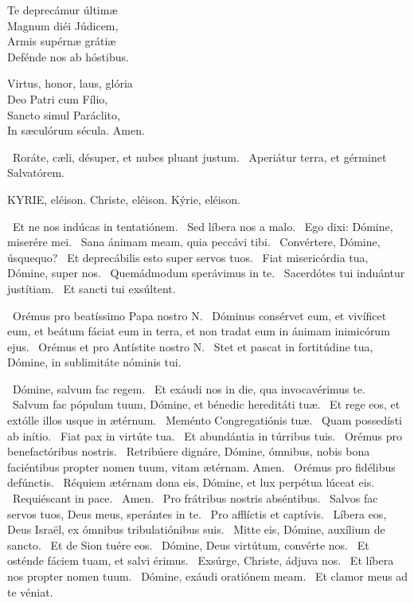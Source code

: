 Te deprecámur últimæ\\
Magnum diéi Júdicem,\\
Armis supérnæ grátiæ\\
Defénde nos ab hóstibus.

Virtus, honor, laus, glória\\
Deo Patri cum Fílio,\\
Sancto simul Paráclito,\\
In sæculórum sécula. Amen.

\V\ Roráte, cæli, désuper, et nubes pluant justum. \R\ Aperiátur terra, et gérminet Salvatórem.




KYRIE, eléison. Christe, eléison. Kýrie, eléison.

 \V\ Et ne nos indúcas in tentatiónem. \R\ Sed líbera nos a malo. \V\ Ego dixi: Dómine, miserére mei. \R\ Sana ánimam meam, quia peccávi tibi. \V\ Convértere, Dómine, úsquequo? \R\ Et deprecábilis esto super servos tuos. \V\ Fiat misericórdia tua, Dómine, super nos. \R\ Quemádmodum sperávimus in te. \V\ Sacerdótes tui induántur justítiam. \R\ Et sancti tui exsúltent.

\V\ Orémus pro beatíssimo Papa nostro N. \R\ Dóminus consérvet eum, et vivíficet eum, et beátum fáciat eum in terra, et non tradat eum in ánimam inimicórum ejus. \V\ Orémus et pro Antístite nostro N. \R\ Stet et pascat in fortitúdine tua, Dómine, in sublimitáte nóminis tui.

\V\ Dómine, salvum fac regem. \R\ Et exáudi nos in die, qua invocavérimus te. \V\ Salvum fac pópulum tuum, Dómine, et bénedic hereditáti tuæ. \R\ Et rege eos, et extólle illos usque in ætérnum. \V\ Meménto Congregatiónis tuæ. \R\ Quam possedísti ab inítio. \V\ Fiat pax in virtúte tua. \R\ Et abundántia in túrribus tuis. \V\ Orémus pro benefactóribus nostris. \R\ Retribúere dignáre, Dómine, ómnibus, nobis bona faciéntibus propter nomen tuum, vitam ætérnam. Amen. \V\ Orémus pro fidélibus defúnctis. \R\ Réquiem ætérnam dona eis, Dómine, et lux perpétua lúceat eis. \V\ Requiéscant in pace. \R\ Amen. \V\ Pro frátribus nostris abséntibus. \R\ Salvos fac servos tuos, Deus meus, sperántes in te. \V\ Pro afflíctis et captívis. \R\ Líbera eos, Deus Israël, ex ómnibus tribulatiónibus suis. \V\ Mitte eis, Dómine, auxílium de sancto. \R\ Et de Sion tuére eos. \V\ Dómine, Deus virtútum, convérte nos. \R\ Et osténde fáciem tuam, et salvi érimus. \V\ Exsúrge, Christe, ádjuva nos. \R\ Et líbera nos propter nomen tuum. \V\ Dómine, exáudi oratiónem meam. \R\ Et clamor meus ad te véniat.

